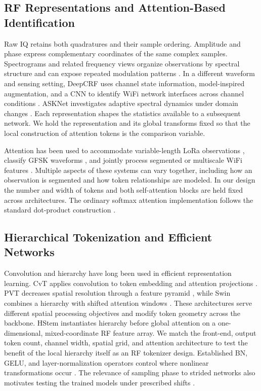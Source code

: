 \documentclass[journal]{IEEEtran}
\begin{document}
\subsection{RF Representations and Attention-Based Identification}
Raw IQ retains both quadratures and their sample ordering. Amplitude and phase express complementary coordinates of the same complex samples. Spectrograms and related frequency views organize observations by spectral structure and can expose repeated modulation patterns \cite{shen2022scalable,ma2025robust}. In a different waveform and sensing setting, DeepCRF uses channel state information, model-inspired augmentation, and a CNN to identify WiFi network interfaces across channel conditions \cite{kong2025deepcrf}. ASKNet investigates adaptive spectral dynamics under domain changes \cite{liu2026ask}. Each representation shapes the statistics available to a subsequent network. We hold the representation and its global transforms fixed so that the local construction of attention tokens is the comparison variable.

Attention has been used to accommodate variable-length LoRa observations \cite{shen2023length}, classify GFSK waveforms \cite{herrera2026transformer}, and jointly process segmented or multiscale WiFi features \cite{hui2025cross,yang2026sinformer}. Multiple aspects of these systems can vary together, including how an observation is segmented and how token relationships are modeled. In our design the number and width of tokens and both self-attention blocks are held fixed across architectures. The ordinary softmax attention implementation follows the standard dot-product construction \cite{vaswani2017attention}.

\subsection{Hierarchical Tokenization and Efficient Networks}
Convolution and hierarchy have long been used in efficient representation learning. CvT applies convolution to token embedding and attention projections \cite{wu2021cvt}. PVT decreases spatial resolution through a feature pyramid \cite{wang2021pvt}, while Swin combines a hierarchy with shifted attention windows \cite{liu2021swin}. These architectures serve different spatial processing objectives and modify token geometry across the backbone. HStem instantiates hierarchy before global attention on a one-dimensional, mixed-coordinate RF feature array. We match the front-end, output token count, channel width, spatial grid, and attention architecture to test the benefit of the local hierarchy itself as an RF tokenizer design. Established BN, GELU, and layer-normalization operators control where nonlinear transformations occur \cite{ioffe2015batch,ba2016layer}. The relevance of sampling phase to strided networks also motivates testing the trained models under prescribed shifts \cite{zhang2019shift}.
\end{document}
